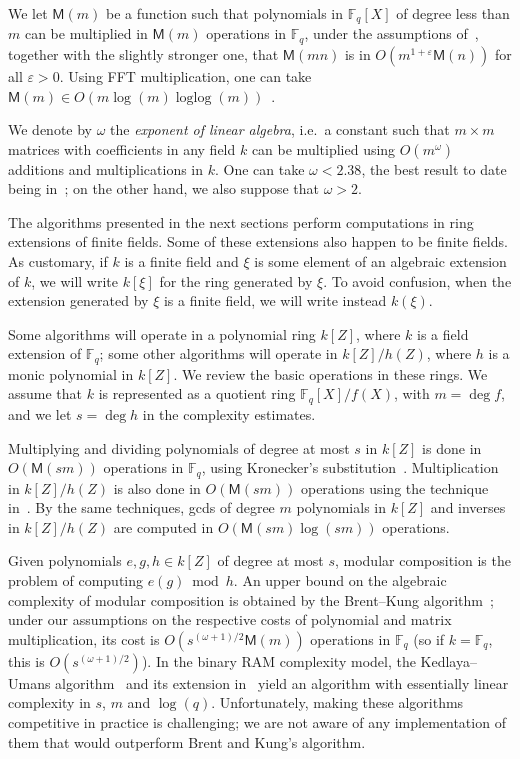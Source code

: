\documentclass{mcom-l}
\theoremstyle{plain}
\theoremstyle{definition}
\DeclareMathOperator{\loglog}{loglog}
\newcommand{\F}{\ensuremath{\mathbb{F}}}
\newcommand{\MM}{\ensuremath{\mathsf{M}}}
\newcounter{algorithm}
\begin{document}
We let $\MM(m)$ be a function such that polynomials in $\F_q[X]$ of
degree less than $m$ can be multiplied in $\MM(m)$ operations in
$\F_q$, under the assumptions of~\cite[Ch.~8.3]{vzGG}, together with
the slightly stronger one, that $\MM(mn)$ is in $O(m^{1+\varepsilon}
\MM(n))$ for all $\varepsilon > 0$. Using FFT multiplication, one can
take $\MM(m)\in O(m\log(m) \loglog(m))$~\cite{cantor+kaltofen91}.

We denote by $\omega$ the \emph{exponent of linear algebra}, i.e.\ a
constant such that $m\times m$ matrices with coefficients in any field
$k$ can be multiplied using $O(m^\omega)$ additions and
multiplications in $k$. One can take $\omega < 2.38$, the best result
to date being in~\cite{LeGall14}; on the other hand, we also suppose
that $\omega > 2$.

The algorithms presented in the next sections perform computations in
ring extensions of finite fields. Some of these extensions also happen
to be finite fields. As customary, if $k$ is a finite field and $\xi$
is some element of an algebraic extension of $k$, we will write
$k[\xi]$ for the ring generated by $\xi$. To avoid confusion, when the
extension generated by $\xi$ is a finite field, we will write instead
$k(\xi)$.

Some algorithms will operate in a polynomial ring $k[Z]$, where $k$ is
a field extension of $\F_q$; some other algorithms will operate in
$k[Z]/h(Z)$, where $h$ is a monic polynomial in $k[Z]$. We review the
basic operations in these rings. We assume that $k$ is represented as
a quotient ring $\F_q[X]/f(X)$, with $m=\deg f$, and we let $s=\deg h$
in the complexity estimates.

Multiplying and dividing polynomials of degree at most $s$ in $k[Z]$
is done in $O(\MM(sm))$ operations in $\F_q$, using Kronecker's
substitution~\cite{moenck76,kaltofen87,vzGG,von1992computing,harvey09}.
Multiplication in $k[Z]/h(Z)$ is also done in $O(\MM(sm))$ operations using the
technique in~\cite{pascal+schost06}. By the same techniques, gcds of
degree $m$ polynomials in $k[Z]$ and inverses in $k[Z]/h(Z)$ are
computed in $O(\MM(sm)\log(sm))$ operations.

Given polynomials $e,g,h \in k[Z]$ of degree at most $s$, modular
composition is the problem of computing $e(g) \bmod h$. An upper bound
on the algebraic complexity of modular composition is obtained by the
Brent--Kung algorithm~\cite{brent+kung}; under our assumptions on the
respective costs of polynomial and matrix multiplication, its cost is
$O(s^{(\omega+1)/2}\MM(m))$ operations in $\F_q$
(so if $k=\F_q$, this is $O(s^{(\omega+1)/2})$). In the binary RAM
complexity model, the Kedlaya--Umans algorithm~\cite{KeUm11} and its
extension in~\cite{PoSc13a} yield an algorithm with essentially linear
complexity in $s$, $m$ and $\log(q)$. Unfortunately, making these
algorithms competitive in practice is challenging; we are not aware of
any implementation of them that would outperform Brent and Kung's
algorithm. 
\end{document}
